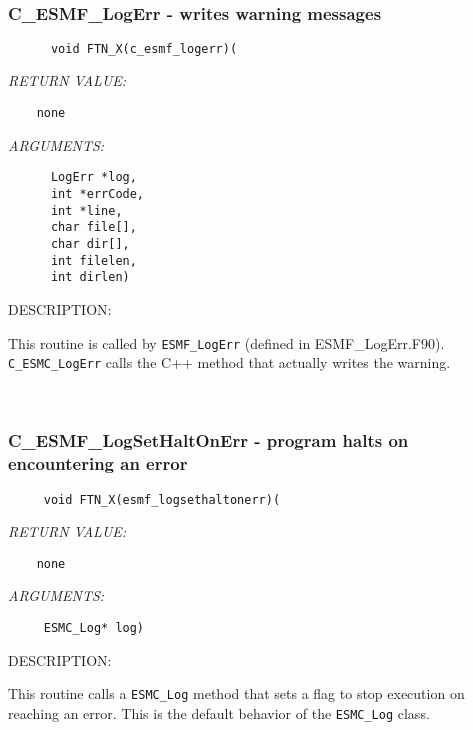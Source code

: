  
\mbox{}\hrulefill\ 
 
\subsubsection [C\_ESMF\_LogErr] {C\_ESMF\_LogErr - writes warning messages}


  
\begin{verbatim}      void FTN_X(c_esmf_logerr)(\end{verbatim}{\em RETURN VALUE:}
\begin{verbatim}    none\end{verbatim}{\em ARGUMENTS:}
\begin{verbatim}      LogErr *log,
      int *errCode,
      int *line, 
      char file[],
      char dir[],
      int filelen,
      int dirlen)\end{verbatim}
{\sf DESCRIPTION:\\ }


      This routine is called by {\tt ESMF\_LogErr} (defined in ESMF\_LogErr.F90). 
      {\tt C\_ESMC\_LogErr} calls the C++ method that actually writes the warning.
   
 
\mbox{}\hrulefill\ 
 

  \subsubsection [C\_ESMF\_LogSetHaltOnErr] {C\_ESMF\_LogSetHaltOnErr - program halts on encountering an error}


  
\begin{verbatim}     void FTN_X(esmf_logsethaltonerr)(\end{verbatim}{\em RETURN VALUE:}
\begin{verbatim}    none\end{verbatim}{\em ARGUMENTS:}
\begin{verbatim}     ESMC_Log* log)\end{verbatim}
{\sf DESCRIPTION:\\ }


      This routine calls a {\tt ESMC\_Log} method that sets
      a flag to stop execution on
      reaching an error. This is the default behavior of the {\tt ESMC\_Log} class. 
 
